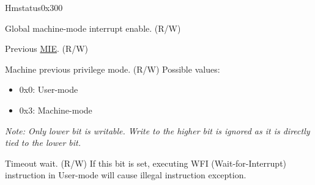 \begin{register}{H}{mstatus}{0x300}\label{regdesc:MSTATUS}
%
%
%
%
%
%
%
%
%
\regnewline%
\begin{regdesc}\begin{reglist}
\label{fielddesc:MSTATUSMIE}\item [MIE] Global machine-mode interrupt enable. (R/W)
\label{fielddesc:MSTATUSMPIE}\item [MPIE] Previous \hyperref[fielddesc:MSTATUSMIE]{MIE}. (R/W)
\label{fielddesc:MSTATUSMPP}\item [MPP] Machine previous privilege mode. (R/W)
\newline Possible values:
\begin{itemize}
    \setlength\itemsep{-1em}
    \item 0x0: User-mode
    \item 0x3: Machine-mode
\end{itemize}
\textit{Note: Only lower bit is writable. Write to the higher bit is ignored as it is directly tied to the lower bit.}
\label{fielddesc:MSTATUSTW}\item [TW] Timeout wait. (R/W)
\newline If this bit is set, executing WFI (Wait-for-Interrupt) instruction in User-mode will cause illegal instruction exception.
\end{reglist}\end{regdesc}
\end{register}


